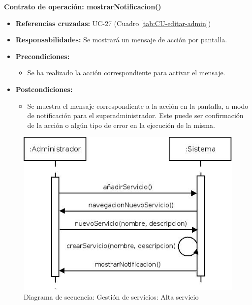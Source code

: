 \textbf{Contrato de operación: mostrarNotificacion()}
\begin{itemize}
\item \textbf{Referencias cruzadas:} UC-27 (Cuadro \ref{tab:CU-editar-admin})
\item \textbf{Responsabilidades:} Se mostrará un mensaje de acción por pantalla.
\item \textbf{Precondiciones:} 
 \begin{itemize}
\item Se ha realizado la acción correspondiente para activar el mensaje.
\end {itemize}
\item \textbf{Postcondiciones:} 
 \begin{itemize}
\item Se muestra el mensaje correspondiente a la acción en la pantalla, a modo de notificación para el superadministrador. Este puede ser confirmación de la acción o algún tipo de error en la ejecución de la misma.
\end {itemize}
\end {itemize}


\vspace{7mm}
\dotfill
\vspace{7mm}

\begin{figure}[h!]
\centering
  \includegraphics[scale=.55]{img/secuencias/gestion-servicios-alta-servicio.jpeg}
  \caption{Diagrama de secuencia: Gestión de servicios: Alta servicio}
  \label{fig:secuencia-gestion-servicios-alta-servicio}
\end{figure}

